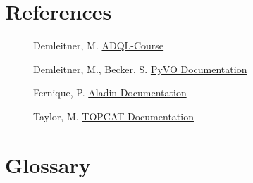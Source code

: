 \documentclass[twoside]{article}[12pt]
\begin{document}
\section{References}

\begin{description}

\item[]Demleitner, M.
\href{http://docs.g-vo.org/adql/html/}{ADQL-Course}

\item[]Demleitner, M., Becker, S.
\href{https://pyvo.readthedocs.io/en/latest/}{PyVO Documentation}

\item[]Fernique, P.
\href{https://aladin.u-strasbg.fr/java/AladinManualV10.pdf}{Aladin
Documentation}

\item[]Taylor, M.
\href{http://www.star.bris.ac.uk/~mbt/topcat/#docs}{TOPCAT Documentation}

\end{description}

\section{Glossary}



   
 
\end{document}
